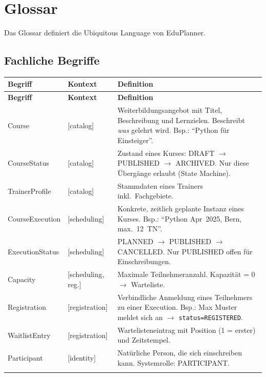 \section{Glossar}

Das Glossar definiert die Ubiquitous Language von EduPlanner.

\subsection{Fachliche Begriffe}

\begin{longtable}{L{3cm} L{2cm} p{\dimexpr\linewidth-5cm-6\tabcolsep\relax}}
  \color{white}\textbf{Begriff} & \color{white}\textbf{Kontext} & \color{white}\textbf{Definition} \\
  \endfirsthead
  \color{white}\textbf{Begriff} & \color{white}\textbf{Kontext} & \color{white}\textbf{Definition} \\
  \endhead
 Course & [catalog] & Weiterbildungsangebot mit Titel, Beschreibung und Lernzielen. Beschreibt \emph{was} gelehrt wird. Bsp.: ``Python für Einsteiger''. \\
  CourseStatus & [catalog] & Zustand eines Kurses: DRAFT $\to$ PUBLISHED $\to$ ARCHIVED. Nur diese Übergänge erlaubt (State Machine). \\
  TrainerProfile & [catalog] & Stammdaten eines Trainers inkl.\ Fachgebiete. \\
  CourseExecution & [scheduling] & Konkrete, zeitlich geplante Instanz eines Kurses. Bsp.: ``Python Apr~2025, Bern, max.\ 12~TN''. \\
  ExecutionStatus & [scheduling] & PLANNED $\to$ PUBLISHED $\to$ CANCELLED. Nur PUBLISHED offen für Einschreibungen. \\
  Capacity & [scheduling, reg.] & Maximale Teilnehmeranzahl. Kapazität = 0 $\to$ Warteliste. \\
  Registration & [registration] & Verbindliche Anmeldung eines Teilnehmers zu einer Execution. Bsp.: Max Muster meldet sich an $\to$ \texttt{status=REGISTERED}. \\
  WaitlistEntry & [registration] & Wartelisteneintrag mit Position (1 = erster) und Zeitstempel. \\
  Participant & [identity] & Natürliche Person, die sich einschreiben kann. Systemrolle: PARTICIPANT. \\

\end{longtable}
